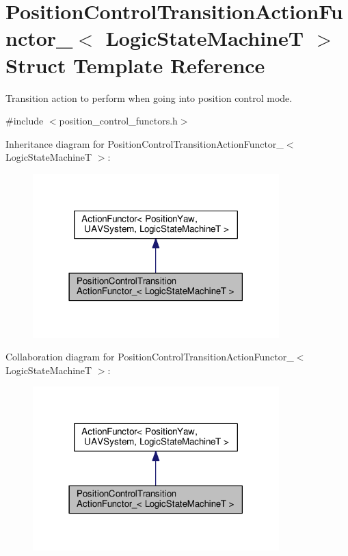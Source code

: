 \hypertarget{structPositionControlTransitionActionFunctor__}{\section{Position\-Control\-Transition\-Action\-Functor\-\_\-$<$ Logic\-State\-Machine\-T $>$ Struct Template Reference}
\label{structPositionControlTransitionActionFunctor__}
}


Transition action to perform when going into position control mode.  




{\ttfamily \#include $<$position\-\_\-control\-\_\-functors.\-h$>$}



Inheritance diagram for Position\-Control\-Transition\-Action\-Functor\-\_\-$<$ Logic\-State\-Machine\-T $>$\-:\nopagebreak
\begin{figure}[H]
\begin{center}
\leavevmode
\includegraphics[width=270pt]{structPositionControlTransitionActionFunctor____inherit__graph}
\end{center}
\end{figure}


Collaboration diagram for Position\-Control\-Transition\-Action\-Functor\-\_\-$<$ Logic\-State\-Machine\-T $>$\-:\nopagebreak
\begin{figure}[H]
\begin{center}
\leavevmode
\includegraphics[width=270pt]{structPositionControlTransitionActionFunctor____coll__graph}
\end{center}
\end{figure}
